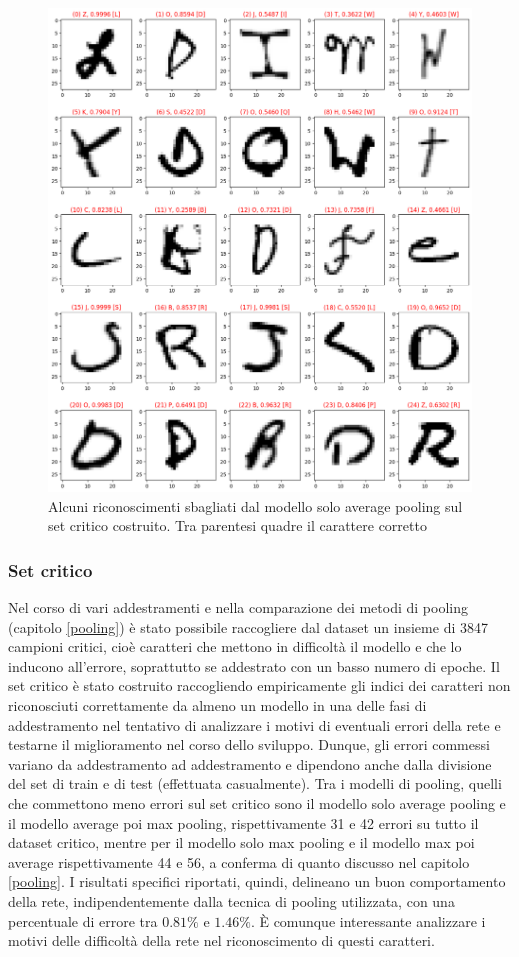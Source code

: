 \documentclass[a4paper,12pt]{article}
\begin{document}
\begin{figure}[H]
\centering
\includegraphics[width=.9\linewidth]{images/wrong_critic.png}
\caption{Alcuni riconoscimenti sbagliati dal modello solo average pooling sul set critico costruito. Tra parentesi quadre il carattere corretto}
\label{wrong_critic}
\end{figure}

\subsubsection{Set critico}
Nel corso di vari addestramenti e nella comparazione dei metodi di pooling (capitolo \ref{pooling}) è stato possibile raccogliere dal dataset un insieme di 3847 campioni critici, cioè caratteri che mettono in difficoltà il modello e che lo inducono all'errore, soprattutto se addestrato con un basso numero di epoche. Il set critico è stato costruito raccogliendo empiricamente gli indici dei caratteri non riconosciuti correttamente da almeno un modello in una delle fasi di addestramento nel tentativo di analizzare i motivi di eventuali errori della rete e testarne il miglioramento nel corso dello sviluppo. Dunque, gli errori commessi variano da addestramento ad addestramento e dipendono anche dalla divisione del set di train e di test (effettuata casualmente). Tra i modelli di pooling, quelli che commettono meno errori sul set critico sono il modello solo average pooling e il modello average poi max pooling, rispettivamente 31 e 42 errori su tutto il dataset critico, mentre per il modello solo max pooling e il modello max poi average rispettivamente 44 e 56, a conferma di quanto discusso nel capitolo \ref{pooling}.
I risultati specifici riportati, quindi, delineano un buon comportamento della rete, indipendentemente dalla tecnica di pooling utilizzata, con una percentuale di errore tra $0.81\%$ e $1.46\%$. È comunque interessante analizzare i motivi delle difficoltà della rete nel riconoscimento di questi caratteri.
\end{document}
